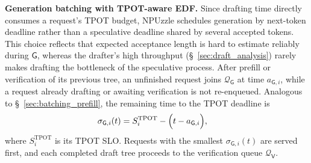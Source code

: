 \documentclass[sigconf,nonacm,10pt]{acmart}
\newcommand{\name}{NPUzzle\xspace}
\begin{document}
\noindent\textbf{Generation batching with TPOT-aware EDF.}\label{sec:schedule_generate}
Since drafting time directly consumes a request's TPOT budget, \name schedules generation by next-token deadline rather than a speculative deadline shared by several accepted tokens.
This choice reflects that expected acceptance length is hard to estimate reliably during $\mathsf G$, whereas the drafter's high throughput (\S~\ref{sec:draft_analysis}) rarely makes drafting the bottleneck of the speculative process.
After prefill or verification of its previous tree, an unfinished request joins $\mathcal Q_{\mathsf G}$ at time $a_{\mathsf G, i}$, while a request already drafting or awaiting verification is not re-enqueued. Analogous to \S~\ref{sec:batching_prefill}, the remaining time to the TPOT deadline is
\begin{equation}
\sigma_{\mathsf G,i}(t)=S_i^{\mathrm{TPOT}}-\Bigl(t - a_{\mathsf G, i} \Bigr),
\quad
\label{equ:g_slack}
\end{equation}
where $S_i^{\mathrm{TPOT}}$ is its TPOT SLO. Requests with the smallest $\sigma_{\mathsf G,i}(t)$ are served first, and each completed draft tree proceeds to the verification queue $\mathcal Q_{\mathsf V}$.
\end{document}
